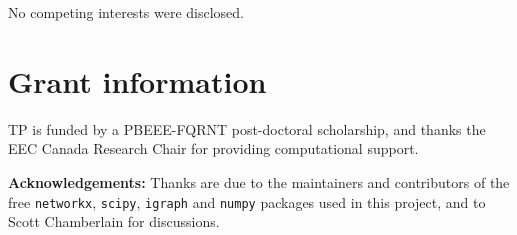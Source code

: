 \documentclass[12pt,oneside]{article}
\begin{document}
No competing interests were disclosed.

\section*{Grant information}

TP is funded by a PBEEE-FQRNT post-doctoral scholarship, and thanks the EEC
Canada Research Chair for providing computational support.

\textbf{Acknowledgements:} Thanks are due to the maintainers and
contributors of the free \texttt{networkx}, \texttt{scipy}, \texttt{igraph}
and \texttt{numpy} packages used in this project, and to Scott Chamberlain
for discussions.

\printbibliography
\end{document}
